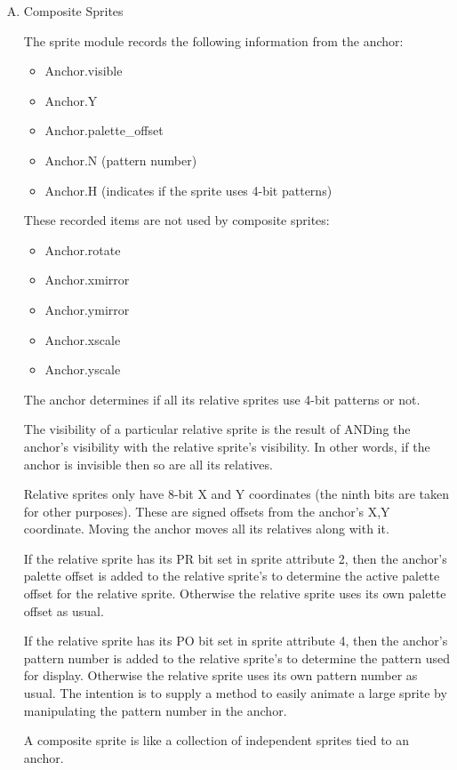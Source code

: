 \begin{enumerate}[A.]
\item Composite Sprites

  The sprite module records the following information from the anchor:
  \begin{itemize}
  \item Anchor.visible
  \item Anchor.Y
  \item Anchor.palette\_offset
  \item Anchor.N (pattern number)
  \item Anchor.H (indicates if the sprite uses 4-bit patterns)
  \end{itemize}
  These recorded items are not used by composite sprites:
  \begin{itemize}
  \item Anchor.rotate
  \item Anchor.xmirror
  \item Anchor.ymirror
  \item Anchor.xscale
  \item Anchor.yscale
  \end{itemize}
  The anchor determines if all its relative sprites use 4-bit patterns or not.
  
  The visibility of a particular relative sprite is the result of
  ANDing the anchor’s visibility with the relative sprite’s
  visibility. In other words, if the anchor is invisible then so are
  all its relatives.

  Relative sprites only have 8-bit X and Y coordinates (the ninth bits
  are taken for other purposes). These are signed offsets from the
  anchor’s X,Y coordinate. Moving the anchor moves all its relatives
  along with it.

  If the relative sprite has its PR bit set in sprite attribute 2,
  then the anchor’s palette offset is added to the relative sprite’s
  to determine the active palette offset for the relative
  sprite. Otherwise the relative sprite uses its own palette offset as
  usual.

  If the relative sprite has its PO bit set in sprite attribute 4,
  then the anchor’s pattern number is added to the relative sprite’s
  to determine the pattern used for display. Otherwise the relative
  sprite uses its own pattern number as usual. The intention is to
  supply a method to easily animate a large sprite by manipulating the
  pattern number in the anchor.

  A composite sprite is like a collection of independent sprites tied
  to an anchor.


\end{enumerate}
